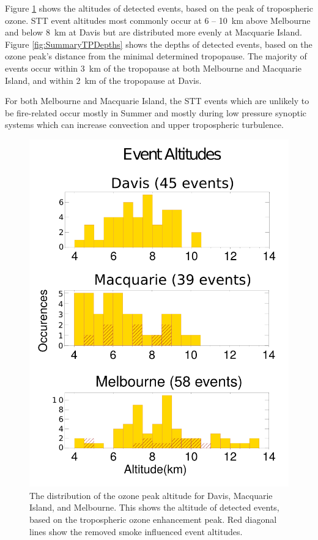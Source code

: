\documentclass{article}
\begin{document}
  Figure \ref{fig:SummaryAltitudes} shows the altitudes of detected events, based on the peak of tropospheric ozone.
  STT event altitudes most commonly occur at 6 -- 10~km above Melbourne and below 8~km at Davis but are distributed more evenly at Macquarie Island. 
  Figure \ref{fig:SummaryTPDepths} shows the depths of detected events, based on the ozone peak's distance from the minimal determined tropopause.
  The majority of events occur within 3~km of the tropopause at both Melbourne and Macquarie Island, and within 2~km of the tropopause at Davis.
  
  For both Melbourne and Macquarie Island, the STT events which are unlikely to be fire-related occur mostly in Summer and mostly during low pressure synoptic systems which can increase convection and upper tropospheric turbulence.

  \begin{figure}[!htbp]
    \begin{center}
    \includegraphics[width=1.0\columnwidth]{figures/Altitudes.png}
    \caption{The distribution of the ozone peak altitude for Davis, Macquarie Island, and Melbourne.
    This shows the altitude of detected events, based on the tropospheric ozone enhancement peak.
    Red diagonal lines show the removed smoke influenced event altitudes.}
    \label{fig:SummaryAltitudes}
    \end{center}
  \end{figure}
\end{document}
